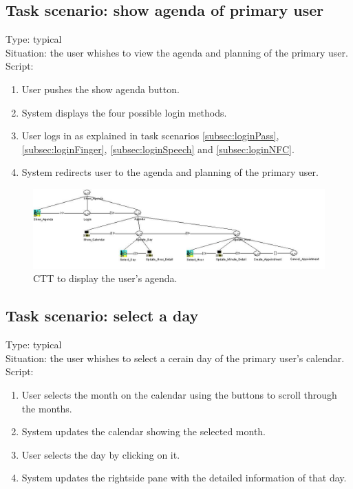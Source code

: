 \documentclass[11pt, a4paper,svglistings]{report}
\begin{document}
\subsection{Task scenario: show agenda of primary user}

\label{subsec:agenda}Type: typical \\
Situation: the user whishes to view  the agenda and planning of the primary user. \\
Script:
\begin{enumerate}
\item User pushes the show agenda button.
\item System displays the four possible login methods.
\item User logs in as explained in task scenarios \ref{subsec:loginPass}, \ref{subsec:loginFinger}, \ref{subsec:loginSpeech} and \ref{subsec:loginNFC}.
\item System redirects user to the agenda and planning of the primary user.
\end{enumerate}

\begin{figure}[H]
\centering
    \includegraphics[width=1\textwidth]{ShowAgenda.jpg}
  \caption[Display agenda CTT]{\label{fig:ShowAgenda}CTT to display the user's agenda.}
\end{figure}

\subsection{Task scenario: select a day}

\label{subsec:day}Type: typical \\
Situation: the user whishes to select a cerain day  of the primary user's calendar. \\
Script:
\begin{enumerate}
\item User selects the month on the calendar using the buttons to scroll through the months.
\item System updates the calendar showing the selected month.
\item User selects the day by clicking on it.
\item System updates the rightside pane with the detailed information of that day.
\end{enumerate}
\end{document}

